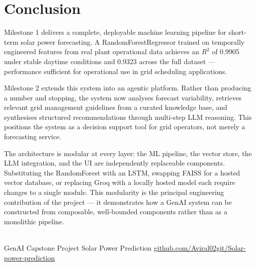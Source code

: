 \documentclass[11pt, a4paper]{article}
\begin{document}
\section{Conclusion}

Milestone 1 delivers a complete, deployable machine learning pipeline for short-term solar
power forecasting. A RandomForestRegressor trained on temporally engineered features from
real plant operational data achieves an $R^2$ of 0.9905 under stable daytime conditions and
0.9323 across the full dataset — performance sufficient for operational use in grid
scheduling applications.

Milestone 2 extends this system into an agentic platform. Rather than producing a number
and stopping, the system now analyses forecast variability, retrieves relevant grid
management guidelines from a curated knowledge base, and synthesises structured
recommendations through multi-step LLM reasoning. This positions the system as a decision
support tool for grid operators, not merely a forecasting service.

The architecture is modular at every layer: the ML pipeline, the vector store, the LLM
integration, and the UI are independently replaceable components. Substituting the
RandomForest with an LSTM, swapping FAISS for a hosted vector database, or replacing
Groq with a locally hosted model each require changes to a single module. This modularity
is the principal engineering contribution of the project — it demonstrates how a GenAI
system can be constructed from composable, well-bounded components rather than as a
monolithic pipeline.

\vspace{1.5cm}
\begin{center}
  \\[6pt]
  {\small\sffamily\color{medgray}
    GenAI Capstone Project \textperiodcentered{} Solar Power Prediction \textperiodcentered{}
    \href{https://github.com/Aviral02git/Solar-power-prediction}
         {github.com/Aviral02git/Solar-power-prediction}
  }
\end{center}
\end{document}
